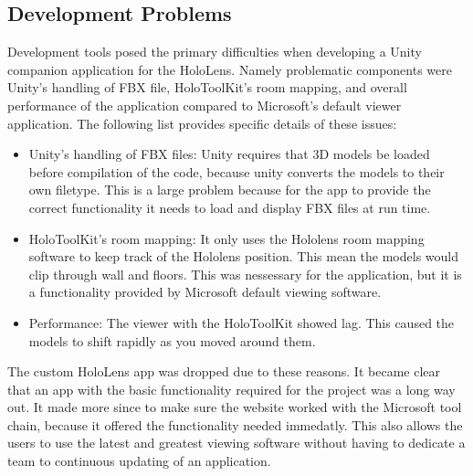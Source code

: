     \subsection{Development Problems}
    Development tools posed the primary difficulties when developing a Unity companion application for the HoloLens. Namely problematic components were Unity's handling of FBX file, HoloToolKit's room mapping, and overall performance of the application compared to Microsoft's default viewer application.
    The following list provides specific details of these issues:
    \begin{itemize}
        \item Unity's handling of FBX files: Unity requires that 3D models be loaded before compilation of the code, because unity converts the models to their own filetype.
        This is a large problem because for the app to provide the correct functionality it needs to load and display FBX files at run time.
        \item HoloToolKit's room mapping: It only uses the Hololens room mapping software to keep track of the Hololens position.
        This mean the models would clip through wall and floors. This was nessessary for the application, but it is a functionality provided by Microsoft default viewing software.
        \item Performance: The viewer with the HoloToolKit showed lag. This caused the models to shift rapidly as you moved around them. 
    \end{itemize}

    The custom HoloLens app was dropped due to these reasons. It became clear that an app with the basic functionality required for the project was a long way out.
    It made more since to make sure the website worked with the Microsoft tool chain, because it offered the functionality needed immedatly.
    This also allows the users to use the latest and greatest viewing software without having to dedicate a team to continuous updating of an application.
